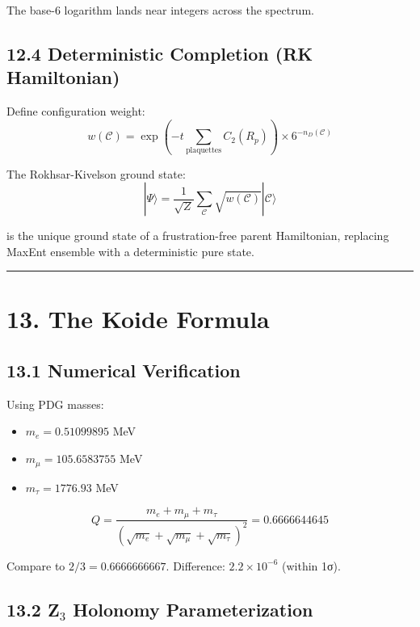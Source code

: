 The base-6 logarithm lands near integers across the spectrum.

\subsection{12.4 Deterministic Completion (RK Hamiltonian)}\label{124-deterministic-completion-rk-hamiltonian}

Define configuration weight: \[w(\mathcal{C}) = \exp\left(-t \sum_{\text{plaquettes}} C_2(R_p)\right) \times 6^{-n_D(\mathcal{C})}\]

The Rokhsar-Kivelson ground state: \[|\Psi\rangle = \frac{1}{\sqrt{Z}} \sum_{\mathcal{C}} \sqrt{w(\mathcal{C})} |\mathcal{C}\rangle\]

is the unique ground state of a frustration-free parent Hamiltonian, replacing MaxEnt ensemble with a deterministic pure state.

\begin{center}\rule{0.5\linewidth}{0.5pt}\end{center}

\section{13. The Koide Formula}\label{13-the-koide-formula}

\subsection{13.1 Numerical Verification}\label{131-numerical-verification}

Using PDG masses:

\begin{itemize}
\tightlist
\item
  \(m_e = 0.51099895\) MeV
\item
  \(m_\mu = 105.6583755\) MeV
\item
  \(m_\tau = 1776.93\) MeV
\end{itemize}

\[Q = \frac{m_e + m_\mu + m_\tau}{(\sqrt{m_e} + \sqrt{m_\mu} + \sqrt{m_\tau})^2} = 0.6666644645\]

Compare to \(2/3 = 0.6666666667\). Difference: \(2.2 \times 10^{-6}\) (within 1σ).

\subsection{13.2 Z$_3$ Holonomy Parameterization}\label{132-zux2083-holonomy-parameterization}

